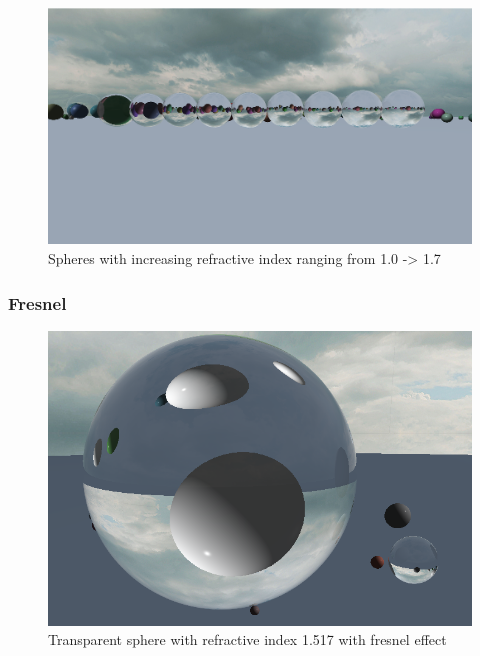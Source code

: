 \documentclass[final]{cmpreport}
\begin{document}
\begin{figure}
    \centering
    \includegraphics[width=\textwidth]{img/refractive_index.png}
    \caption{Spheres with increasing refractive index ranging from 1.0 -> 1.7}
    \label{spheres_refractive_index}
\end{figure}

\subsubsection{Fresnel}

\begin{figure}
    \centering
    \includegraphics[width=\textwidth]{img/fresnel_solid.png}
    \caption{Transparent sphere with refractive index 1.517 with fresnel effect}
    \label{fresnel_solid}
\end{figure}
\end{document}
